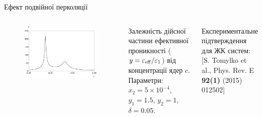 \documentclass[10pt]{beamer}
\begin{document}
\begin{frame}{Ефект подвійної перколяції}
\begin{columns}[T,onlytextwidth]
      \begin{figure}
        \centering
        \includegraphics[width=0.99\textwidth]{images/Permit1.eps}
      \end{figure}
        \vspace{-10pt}\hfill
      \begin{minipage}[t]{0.9\textwidth}
        Залежність дійсної частини ефективної проникності ($y = \varepsilon_{\rm eff}/\varepsilon_1$) від концентрації ядер $c$. Параметри: $x_2 = 5 \times 10^{-4}$, $y_1 = 1.5$, $y_2=1$, $\delta=0.05$.
        
        \vspace{20pt}
Експериментальне підтверждення для ЖК систем: [S. Tomylko et al., Phys. Rev. E {\bf 92(1)} (2015) 012502]
      \end{minipage}
\end{columns}
\end{frame}


\end{document}
